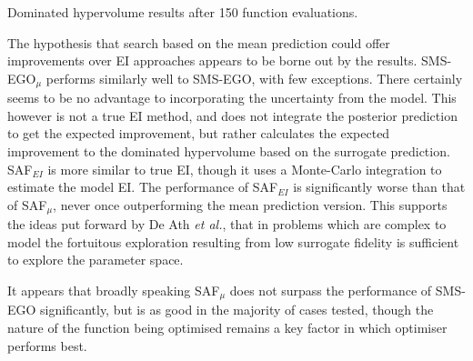\documentclass[conference]{IEEEtran}
\makeatletter
\newcommand\safmu{SAF$_{\mu}$\xspace}
\newcommand\safei{SAF$_{EI}$\xspace}
\newcommand\smsego{SMS-EGO\xspace}
\newcommand\smsegomu{SMS-EGO$_{\mu}$\xspace}
\newcommand\ei{EI\xspace}
\newcommand*{\etal}{\textit{et al.}\@\xspace}
\makeatother
\begin{document}
\begin{table}[t]
\begin{subtable}[b]{\columnwidth}
\setlength{\tabcolsep}{2pt}
\end{subtable}
\begin{subtable}[b]{\columnwidth}
\setlength{\tabcolsep}{2pt}
\end{subtable}
\begin{subtable}[b]{\columnwidth}
\setlength{\tabcolsep}{2pt}
\end{subtable}
\caption{Dominated hypervolume results after 150 function evaluations.}
\label{tab: hv_results}
\end{table}

The hypothesis that search based on the mean prediction could offer improvements over \ei approaches appears to be borne out by the results. \smsegomu performs similarly well to \smsego, with few exceptions. There certainly seems to be no advantage to incorporating the uncertainty from the model. This however is not a true \ei method, and does not integrate the posterior prediction to get the expected improvement, but rather calculates the expected improvement to the dominated hypervolume based on the surrogate prediction. \safei is more similar to true \ei, though it uses a Monte-Carlo integration to estimate the model \ei. The performance of \safei is significantly worse than that of \safmu, never once outperforming the mean prediction version. This supports the ideas put forward by De Ath \etal \cite{death2019greed}, that in problems which are complex to model the fortuitous exploration resulting from low surrogate fidelity is sufficient to explore the parameter space.

It appears that broadly speaking \safmu does not surpass the performance of \smsego significantly, but is as good in the majority of cases tested, though the nature of the  function being optimised remains a key factor in which optimiser performs best. 
\end{document}
